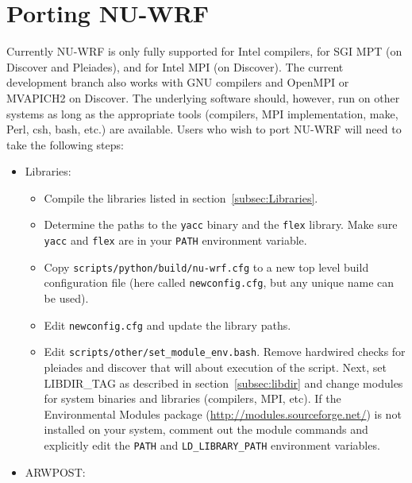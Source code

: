 \section{Porting NU-WRF}
\label{sec:Porting}

Currently NU-WRF is only fully supported for Intel compilers, for SGI MPT (on 
Discover and Pleiades), and for Intel MPI (on Discover).  The current development 
branch also works with GNU compilers and OpenMPI or MVAPICH2 on Discover. 
The underlying  software should, however, run on other systems as long as the 
appropriate tools (compilers, MPI implementation, make, Perl, csh, bash, etc.) are 
available.  Users who wish to port NU-WRF will need to take the following 
steps:

\begin{itemize}
\item Libraries:
  \begin{itemize}

  \item Compile the libraries listed in section~\ref{subsec:Libraries}.

  \item Determine the paths to the \texttt{yacc} binary and the \texttt{flex} 
    library. Make sure \texttt{yacc} and \texttt{flex} are in your 
    \texttt{PATH} environment variable.

  \item Copy \texttt{scripts/python/build/nu-wrf.cfg} to a new top level build configuration file 
    (here called \texttt{newconfig.cfg}, but any unique name can be used).

  \item Edit \texttt{newconfig.cfg} and update the library paths.

  \item Edit \texttt{scripts/other/set\_module\_env.bash}. Remove hardwired checks for 
   pleiades and discover that will about execution of the script. Next, set LIBDIR\_TAG as described
    in section~\ref{subsec:libdir} and change modules for system binaries and 
    libraries (compilers, MPI, etc). If the Environmental Modules package 
    (\url{http://modules.sourceforge.net/}) is not installed on your system, 
    comment out the module commands and explicitly edit the \texttt{PATH} and 
    \texttt{LD\_LIBRARY\_PATH} environment variables.  
  \end{itemize}

\item ARWPOST:

  \begin{itemize}


\end{itemize}
\end{itemize}
